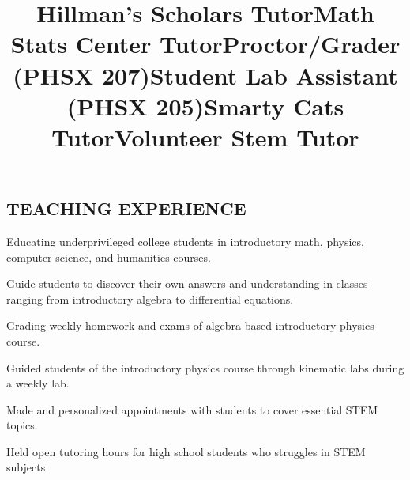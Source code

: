 \documentclass[margin]{res}
\begin{document}
\begin{resume}
\section{TEACHING EXPERIENCE}
\title{\textbf{Hillman's Scholars Tutor}}
\begin{position}
Educating underprivileged college students in introductory math, physics, computer science, and humanities courses.
\end{position}
\title{\textbf{Math Stats Center Tutor}}
\begin{position}
Guide students to discover their own answers and understanding in classes ranging from introductory algebra to differential equations.
\end{position}
\title{\textbf{Proctor/Grader (PHSX 207)}}
\begin{position}
Grading weekly homework and exams of algebra based introductory physics course. 
\end{position}
\title{\textbf{Student Lab Assistant (PHSX 205)}}
\begin{position}
Guided students of the introductory physics course through kinematic labs during a weekly lab. 
\end{position}
\title{\textbf{Smarty Cats Tutor}}
\begin{position}
Made and personalized appointments with students to cover essential STEM topics.
\end{position}
\title{\textbf{Volunteer Stem Tutor}}
\begin{position}
Held open tutoring hours for high school students who struggles in STEM subjects
\end{position}




\end{resume}
\end{document}
